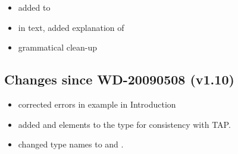 \documentclass[11pt,a4paper]{ivoa}
\begin{document}
\begin{itemize}
  \item added 
       to 
  \item in text, added explanation of
  \item grammatical clean-up
\end{itemize}

\subsection{Changes since WD-20090508 (v1.10)}

\begin{itemize}
  \item corrected errors in example in Introduction
  \item added  and
        elements to the
        type for consistency with TAP.
  \item changed type names  to
        and 
       .
\end{itemize}


\end{document}
